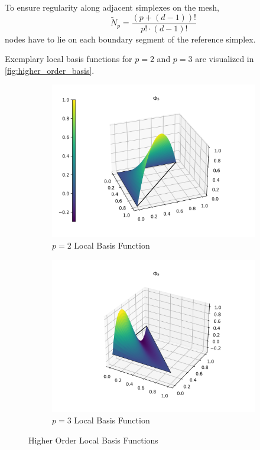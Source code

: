 \documentclass[11pt,a4paper]{article}
\begin{document}
\begin{multicols}{2}
To ensure regularity along adjacent simplexes on the mesh,
$$\tilde{N}_{p} = \frac{(p+(d-1))!}{p!\cdot(d-1)!}$$
nodes have to lie on each boundary segment of the reference simplex.

Exemplary local basis functions for $p=2$ and $p=3$ are visualized in \autoref{fig:higher_order_basis}.
\begin{figure}[H]
  \centering
  \begin{subfigure}{.49\linewidth}
    \includegraphics[width=1\linewidth]{p2_basis}
    \caption{$p=2$ Local Basis Function}
  \end{subfigure}\hfill%
  \begin{subfigure}{.49\linewidth}
    \raggedright
    \includegraphics[width=1\linewidth]{p3_basis}
    \caption{$p=3$ Local Basis Function}
  \end{subfigure}
  \caption{Higher Order Local Basis Functions}
  \label{fig:higher_order_basis}
\end{figure}


\end{multicols}
\end{document}
